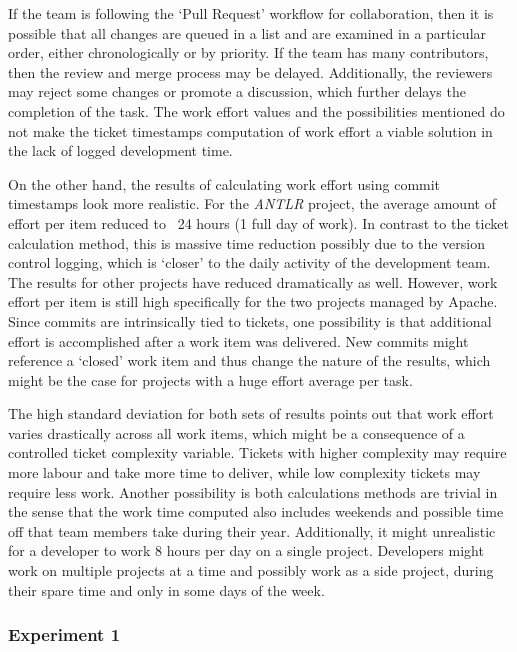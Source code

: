 \documentclass{mpaper}
\begin{document}
If the team is following the `Pull Request' workflow for collaboration, then it
is possible that all changes are queued in a list and are examined in a
particular order, either chronologically or by priority. If the team has many
contributors, then the review and merge process may be delayed. Additionally,
the reviewers may reject some changes or promote a discussion, which further
delays the completion of the task. The work effort values and the possibilities
mentioned do not make the ticket timestamps computation of work effort a viable
solution in the lack of logged development time.

On the other hand, the results of calculating work effort using commit
timestamps look more realistic. For the \emph{ANTLR} project, the average amount
of effort per item reduced to ~24 hours (1 full day of work). In contrast
to the ticket calculation method, this is massive time reduction possibly due to
the version control logging, which is `closer' to the daily activity of the
development team. The results for other projects have reduced dramatically as
well. However, work effort per item is still high specifically for the two
projects managed by Apache. Since commits are intrinsically tied to tickets, one
possibility is that additional effort is accomplished after a work item was
delivered. New commits might reference a `closed' work item and thus change the
nature of the results, which might be the case for projects with a huge effort
average per task.

The high standard deviation for both sets of results points out that work effort
varies drastically across all work items, which might be a consequence of a
controlled ticket complexity variable. Tickets with higher complexity may
require more labour and take more time to deliver, while low complexity tickets
may require less work. Another possibility is both calculations methods are
trivial in the sense that the work time computed also includes weekends and
possible time off that team members take during their year. Additionally, it
might unrealistic for a developer to work 8 hours per day on a single project.
Developers might work on multiple projects at a time and possibly work as a side
project, during their spare time and only in some days of the week.

\subsubsection*{Experiment 1}
\label{experiment-1}
\end{document}
